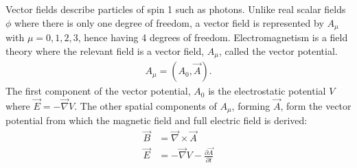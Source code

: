 \documentclass[a4paper,11pt]{article}
\numberwithin{equation}{section}
\theoremstyle{definition}
\begin{document}
Vector fields describe particles of spin 1 such as photons. Unlike real scalar fields $\phi$ where there is only one degree of freedom, a vector field is represented by $A_\mu$ with $\mu = 0,1,2,3$, hence having 4 degrees of freedom. Electromagnetism is a field theory where the relevant field is a vector field, $A_\mu$, called the vector potential.
\begin{align*}
A_\mu = (A_0, \vec{A}).
\end{align*}
The first component of the vector potential, $A_0$ is the electrostatic potential $V$ where $\vec{E} = -\vec{\nabla}V$. The other spatial components of $A_\mu$, forming $\vec{A}$, form the vector potential from which the magnetic field and full electric field is derived:
\begin{align*}
\vec{B} &= \vec{\nabla}\times \vec{A}\\
\vec{E} &= -\vec{\nabla}V - \frac{\partial \vec{A}}{\partial t}
\end{align*}
\end{document}

